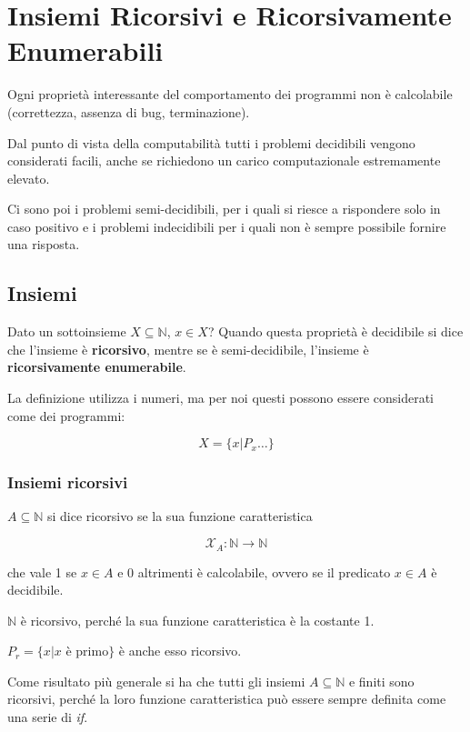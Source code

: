 
\chapter{Insiemi Ricorsivi e Ricorsivamente Enumerabili}

Ogni proprietà interessante del comportamento dei programmi non è calcolabile (correttezza, assenza di bug, terminazione).


Dal punto di vista della computabilità tutti i problemi decidibili vengono considerati facili, anche se richiedono un carico computazionale estremamente elevato.

Ci sono poi i problemi semi-decidibili, per i quali si riesce a rispondere solo in caso positivo e i problemi indecidibili per i quali non è sempre possibile fornire una risposta.

\section{Insiemi}

Dato un sottoinsieme $ X \subseteq \mathbb{N} $, $ x \in X $? Quando questa proprietà è decidibile si dice che l'insieme è \textbf{ricorsivo}, mentre se è semi-decidibile, l'insieme è \textbf{ricorsivamente enumerabile}.

La definizione utilizza i numeri, ma per noi questi possono essere considerati come dei programmi:

$$
X = \{ x | P_x \ldots \}
$$

\subsection{Insiemi ricorsivi}

$A \subseteq \mathbb{N}$ si dice ricorsivo se la sua funzione caratteristica

$$
\mathcal{X}_A : \mathbb{N} \rightarrow \mathbb{N}
$$ 

che vale 1 se $ x \in A $ e 0 altrimenti è calcolabile, ovvero se il predicato $ x \in A $ è decidibile.

$\mathbb{N}$ è ricorsivo, perché la sua funzione caratteristica è la costante 1.

$P_r = \{x | x \text{ è primo}\}$ è anche esso ricorsivo.

Come risultato più generale si ha che tutti gli insiemi $ A \subseteq \mathbb{N} $ e finiti sono ricorsivi, perché la loro funzione caratteristica può essere sempre definita come una serie di \textit{if}.

